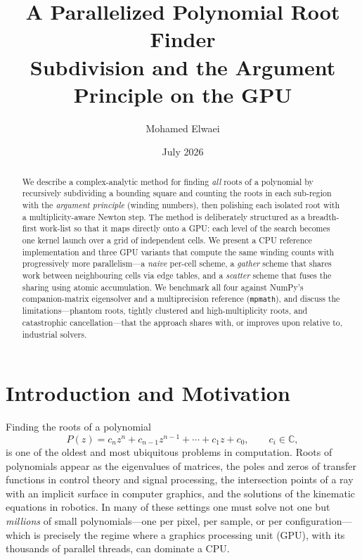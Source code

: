 \documentclass[11pt]{article}
\title{\textbf{A Parallelized Polynomial Root Finder}\\[2pt]
       \large Subdivision and the Argument Principle on the GPU}
\author{Mohamed Elwaei}
\date{July 2026}
\newcommand{\C}{\mathbb{C}}
\begin{document}
\maketitle

\begin{abstract}
We describe a complex-analytic method for finding \emph{all} roots of a
polynomial by recursively subdividing a bounding square and counting the roots
in each sub-region with the \emph{argument principle} (winding numbers), then
polishing each isolated root with a multiplicity-aware Newton step. The method
is deliberately structured as a breadth-first work-list so that it maps directly
onto a GPU: each level of the search becomes one kernel launch over a grid of
independent cells. We present a CPU reference implementation and three GPU
variants that compute the same winding counts with progressively more
parallelism---a \emph{naive} per-cell scheme, a \emph{gather} scheme that shares
work between neighbouring cells via edge tables, and a \emph{scatter} scheme
that fuses the sharing using atomic accumulation. We benchmark all four against
NumPy's companion-matrix eigensolver and a multiprecision reference
(\texttt{mpmath}), and discuss the limitations---phantom roots, tightly
clustered and high-multiplicity roots, and catastrophic cancellation---that the
approach shares with, or improves upon relative to, industrial solvers.
\end{abstract}

\section{Introduction and Motivation}
Finding the roots of a polynomial
\[
  P(z) = c_n z^n + c_{n-1} z^{n-1} + \cdots + c_1 z + c_0, \qquad c_i \in \C,
\]
is one of the oldest and most ubiquitous problems in computation. Roots of
polynomials appear as the eigenvalues of matrices, the poles and zeros of
transfer functions in control theory and signal processing, the intersection
points of a ray with an implicit surface in computer graphics, and the
solutions of the kinematic equations in robotics. In many of these settings one
must solve not one but \emph{millions} of small polynomials---one per pixel, per
sample, or per configuration---which is precisely the regime where a graphics
processing unit (GPU), with its thousands of parallel threads, can dominate a
CPU.
\end{document}
